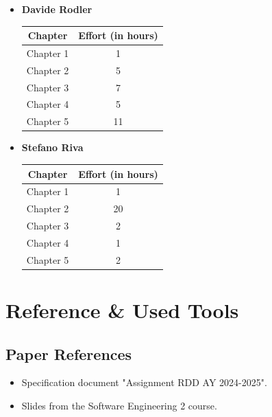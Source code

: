 \documentclass[12pt]{article}
\numberwithin{figure}{section}
\numberwithin{table}{section}
\begin{document}
    \begin{itemize}
        \item \textbf{Davide Rodler}
            \begin{table}[H]
                \centering
                \begin{tabular}{|c|c|}
                    \hline
                    \textbf{Chapter} & \textbf{Effort (in hours)} \\
                    \hline
                    Chapter 1 &  1\\
                    \hline
                    Chapter 2 &  5\\
                    \hline
                    Chapter 3 &  7\\
                    \hline
                    Chapter 4 &  5\\
                    \hline
                    Chapter 5 & 11\\
                    \hline
                \end{tabular}
            \end{table} 
            
        \item \textbf{Stefano Riva}
            \begin{table}[H]
                \centering
                \begin{tabular}{|c|c|}
                    \hline
                    \textbf{Chapter} & \textbf{Effort (in hours)} \\
                    \hline
                    Chapter 1 &  1\\
                    \hline
                    Chapter 2 &  20\\
                    \hline
                    Chapter 3 &  2\\
                    \hline
                    Chapter 4 &  1\\
                    \hline
                    Chapter 5 &  2\\
                    \hline
                \end{tabular}
            \end{table}
    \end{itemize}

\section{Reference \& Used Tools}
\subsection{Paper References}
    \begin{itemize}
        \item Specification document "Assignment RDD AY 2024-2025".
        \item Slides from the Software Engineering 2 course.
    \end{itemize}
\end{document}
